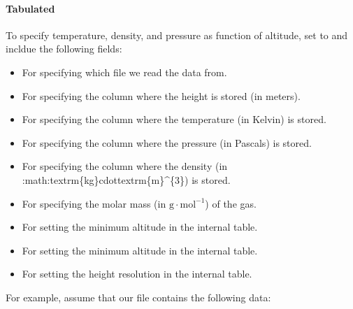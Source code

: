 \documentclass[letterpaper,10pt,english]{sphinxmanual}
\begin{document}
\paragraph{Tabulated}
\label{\detokenize{Applications/CdrPlasmaModel:tabulated}}
To specify temperature, density, and pressure as function of altitude, set  to  and incldue the following fields:
\begin{itemize}
\item {} 
 For specifying which file we read the data from.

\item {} 
 For specifying the column where the height is stored (in meters).

\item {} 
 For specifying the column where the temperature (in Kelvin) is stored.

\item {} 
 For specifying the column where the pressure (in Pascals) is stored.

\item {} 
 For specifying the column where the density (in :math:{\color{red}\bfseries{}\textasciigrave{}}textrm\{kg\}cdottextrm\{m\}\textasciicircum{}\{\sphinxhyphen{}3\}) is stored.

\item {} 
 For specifying the molar mass (in \(\textrm{g}\cdot\textrm{mol}^{-1}\)) of the gas.

\item {} 
 For setting the minimum altitude in the  internal table.

\item {} 
 For setting the minimum altitude in the  internal table.

\item {} 
 For setting the height resolution in the  internal table.

\end{itemize}

For example, assume that our file  contains the following data:
\end{document}
